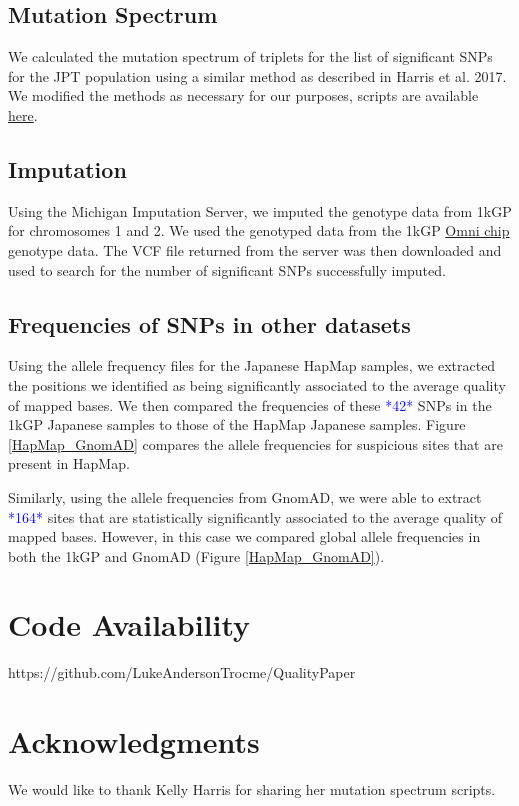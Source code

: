 \documentclass[9pt,lineno]{elife}
\newcommand{\todo}[1]{\textcolor{blue}{*#1*}}
\begin{document}
\subsection{Mutation Spectrum}
We calculated the mutation spectrum of triplets for the list of significant SNPs for the JPT population using a similar method as described in Harris et al. 2017. \citep{Harris2017a}
We modified the methods as necessary for our purposes, scripts are available \href{https://github.com/LukeAndersonTrocme/QualityPaper}{here}. 

\subsection{Imputation}
Using the Michigan Imputation Server, we imputed the genotype data from 1kGP for chromosomes 1 and 2.
We used the genotyped data from the 1kGP \href{ftp://ftp.1000genomes.ebi.ac.uk/vol1/ftp/release/20130502/supporting/hd_genotype_chip/ALL.chip.omni_broad_sanger_combined.20140818.snps.genotypes.vcf.gz}{Omni chip} genotype data.
The VCF file returned from the server was then downloaded and used to search for the number of significant SNPs successfully imputed. 

\subsection{Frequencies of SNPs in other datasets}
Using the allele frequency files for the Japanese HapMap samples, we extracted the positions we identified as being significantly associated to the average quality of mapped bases. We then compared the frequencies of these \todo{42} SNPs in the 1kGP Japanese samples to those of the HapMap Japanese samples. Figure \ref{HapMap_GnomAD} compares the allele frequencies for suspicious sites that are present in HapMap.

Similarly, using the allele frequencies from GnomAD, we were able to extract \todo{164} sites that are statistically significantly associated to the average quality of mapped bases. However, in this case we compared global allele frequencies in both the 1kGP and GnomAD (Figure \ref{HapMap_GnomAD}). 

\section{Code Availability}
https://github.com/LukeAndersonTrocme/QualityPaper

\section{Acknowledgments}
We would like to thank Kelly Harris for sharing her mutation spectrum scripts.
\end{document}
